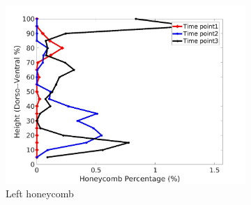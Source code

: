 \begin{figure}[H]
\begin{subfigure}{.42\linewidth}
  \includegraphics[width=\linewidth,trim={{.0\wd0} {.0\wd0} {.0\wd0} {.0\wd0}},clip]{Appendix/Image_AppexA/DorsoToVentral/IPF15LeftLungHoneycombDiseaseDorsoToVentral.jpg} %
  \caption{Left honeycomb}
  \label{fig:IPF15DiseaseDorsoToVentral-e} 
\end{subfigure} 
\begin{subfigure}{.42\linewidth}%

\end{subfigure}
\end{figure}
